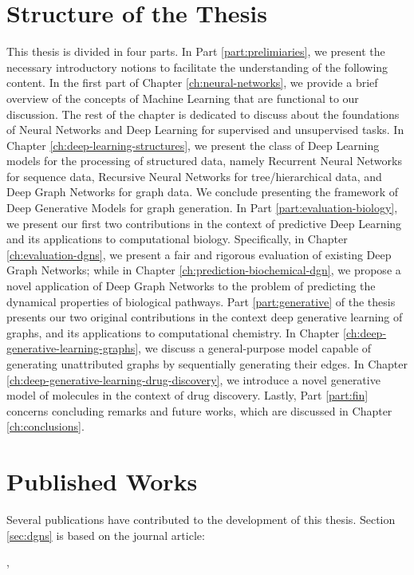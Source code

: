 \section{Structure of the Thesis}
This thesis is divided in four parts. In Part \ref{part:prelimiaries}, we present the necessary introductory notions to facilitate the understanding of the following content. In the first part of Chapter \ref{ch:neural-networks}, we provide a brief overview of the concepts of Machine Learning that are functional to our discussion. The rest of the chapter is dedicated to discuss about the foundations of Neural Networks and Deep Learning for supervised and unsupervised tasks. In Chapter \ref{ch:deep-learning-structures}, we present the class of Deep Learning models for the processing of structured data, namely Recurrent Neural Networks for sequence data, Recursive Neural Networks for tree/hierarchical data, and Deep Graph Networks for graph data. We conclude presenting the framework of Deep Generative Models for graph generation. In Part \ref{part:evaluation-biology}, we present our first two contributions in the context of predictive Deep Learning and its applications to computational biology. Specifically, in Chapter \ref{ch:evaluation-dgns}, we present a fair and rigorous evaluation of existing Deep Graph Networks; while in Chapter \ref{ch:prediction-biochemical-dgn}, we propose a novel application of Deep Graph Networks to the problem of predicting the dynamical properties of biological pathways. Part \ref{part:generative} of the thesis presents our two original contributions in the context deep generative learning of graphs, and its applications to computational chemistry. In Chapter \ref{ch:deep-generative-learning-graphs}, we discuss a general-purpose  model capable of generating unattributed graphs by sequentially generating their edges. In Chapter \ref{ch:deep-generative-learning-drug-discovery}, we introduce a novel generative model of molecules in the context of drug discovery. Lastly, Part \ref{part:fin} concerns concluding remarks and future works, which are discussed in Chapter \ref{ch:conclusions}.

\section{Published Works}
Several publications have contributed to the development of this thesis. Section \ref{sec:dgns} is based on the journal article:

\vspace{1em}
,
\vspace{1em}

